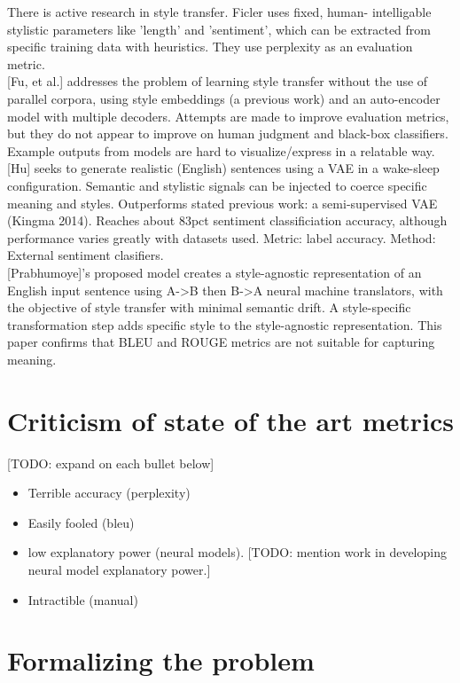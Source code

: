 \documentclass[letterpaper, 10 pt, conference]{ieeeconf}  %
\begin{document}
There is active research in style transfer. Ficler uses fixed, human- intelligable stylistic parameters like ’length’ and ’sentiment’, which can be extracted from specific training data with heuristics. They use perplexity as an evaluation metric.
\\ 

[Fu, et al.] addresses the problem of learning style transfer without the use of parallel corpora, using style embeddings (a previous work) and an auto-encoder model with multiple decoders. Attempts are made to improve evaluation metrics, but they do not appear to improve on human judgment and black-box classifiers. Example outputs from models are hard to visualize/express in a relatable way.
\\ 

[Hu] seeks to generate realistic (English) sentences using a VAE in a wake-sleep configuration. Semantic and stylistic signals can be injected to coerce specific meaning and styles.
Outperforms stated previous work: a semi-supervised VAE (Kingma 2014). Reaches about 83pct sentiment classificiation accuracy, although performance varies greatly with datasets used. 
Metric: label accuracy. Method: External sentiment clasifiers.
\\ 

[Prabhumoye]'s proposed model creates a style-agnostic representation of an English input sentence using A->B then B->A neural machine translators, with the objective of style transfer with minimal semantic drift. A style-specific transformation step adds specific style to the style-agnostic representation. This paper confirms that BLEU and ROUGE metrics are not suitable for capturing meaning.

\section{Criticism of state of the art metrics}
[TODO: expand on each bullet below]
\begin{itemize}
  \item Terrible accuracy (perplexity)
  \item Easily fooled (bleu)
  \item low explanatory power (neural models). [TODO: mention work in developing neural model explanatory power.]
  \item Intractible (manual)
\end{itemize}

\section{Formalizing the problem}
\end{document}
